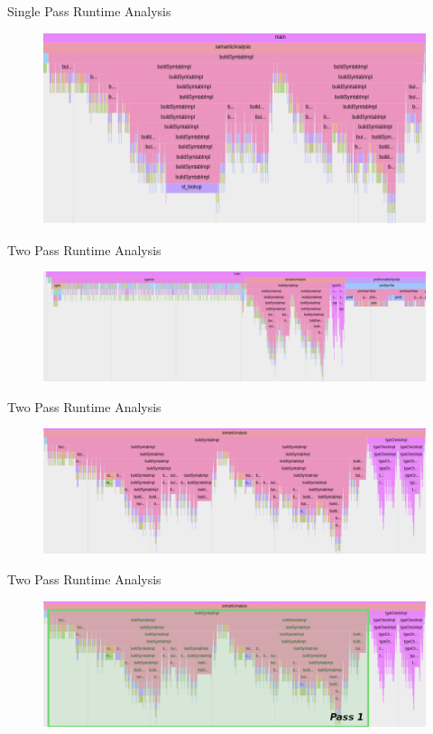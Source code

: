 \documentclass{bredelebeamer}
\begin{document}
\begin{frame}{Single Pass Runtime Analysis}
	\begin{figure}
		\centering
		\includegraphics[scale=0.5]{figure/onepass_semantic.png}
	\end{figure}
\end{frame}

\begin{frame}{Two Pass Runtime Analysis}
	\begin{figure}
		\centering
		\includegraphics[scale=0.3]{figure/twopass_trace.png}
	\end{figure}
\end{frame}

\begin{frame}{Two Pass Runtime Analysis}
	\begin{figure}
		\centering
		\includegraphics[scale=0.35]{figure/twopass_semantic.png}
	\end{figure}
\end{frame}

\begin{frame}{Two Pass Runtime Analysis}
	\begin{figure}
		\centering
		\includegraphics[scale=0.35]{figure/twopass_pass1.png}
	\end{figure}
\end{frame}
\end{document}
